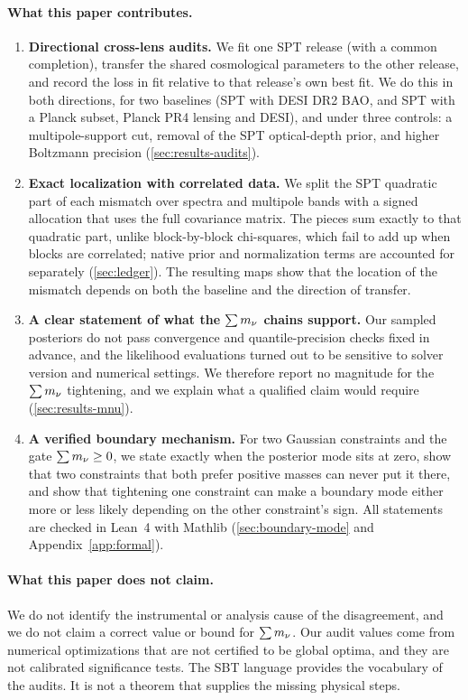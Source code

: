\paragraph{What this paper contributes.}
\begin{enumerate}[leftmargin=*, itemsep=2pt]
  \item \textbf{Directional cross-lens audits.} We fit one SPT release (with a common completion), transfer the shared cosmological parameters to the other release, and record the loss in fit relative to that release's own best fit. We do this in both directions, for two baselines (SPT with DESI DR2 BAO, and SPT with a Planck subset, Planck PR4 lensing and DESI), and under three controls: a multipole-support cut, removal of the SPT optical-depth prior, and higher Boltzmann precision (\cref{sec:results-audits}).
  \item \textbf{Exact localization with correlated data.} We split the SPT quadratic part of each mismatch over spectra and multipole bands with a signed allocation that uses the full covariance matrix. The pieces sum exactly to that quadratic part, unlike block-by-block chi-squares, which fail to add up when blocks are correlated; native prior and normalization terms are accounted for separately (\cref{sec:ledger}). The resulting maps show that the location of the mismatch depends on both the baseline and the direction of transfer.
  \item \textbf{A clear statement of what the $\sum m_\nu$ chains support.} Our sampled posteriors do not pass convergence and quantile-precision checks fixed in advance, and the likelihood evaluations turned out to be sensitive to solver version and numerical settings. We therefore report no magnitude for the $\sum m_\nu$ tightening, and we explain what a qualified claim would require (\cref{sec:results-mnu}).
  \item \textbf{A verified boundary mechanism.} For two Gaussian constraints and the gate $\sum m_\nu\ge0$, we state exactly when the posterior mode sits at zero, show that two constraints that both prefer positive masses can never put it there, and show that tightening one constraint can make a boundary mode either more or less likely depending on the other constraint's sign. All statements are checked in Lean~4 with Mathlib \cite{lean4,mathlib} (\cref{sec:boundary-mode} and Appendix~\ref{app:formal}).
\end{enumerate}

\paragraph{What this paper does not claim.}
We do not identify the instrumental or analysis cause of the disagreement, and we do not claim a correct value or bound for $\sum m_\nu$. Our audit values come from numerical optimizations that are not certified to be global optima, and they are not calibrated significance tests. The SBT language provides the vocabulary of the audits. It is not a theorem that supplies the missing physical steps.

